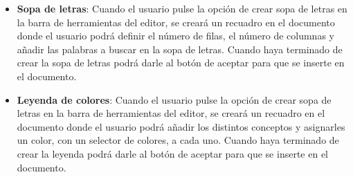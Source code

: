 \begin{itemize}
  \item \textbf{Sopa de letras}: Cuando el usuario pulse la opción de crear sopa de letras en la barra de herramientas del editor,
        se creará un recuadro en el documento donde el usuario podrá definir el número de filas, el número de columnas y añadir las palabras a buscar en la sopa de letras. Cuando haya terminado de crear la sopa de letras podrá darle al botón de aceptar para que se inserte en el documento.
  \item \textbf{Leyenda de colores}: Cuando el usuario pulse la opción de crear sopa de letras en la barra de herramientas del editor, se creará un recuadro en el documento donde el usuario podrá añadir los distintos conceptos y asignarles un color, con un selector de colores, a cada uno. Cuando haya terminado de crear la leyenda podrá darle al botón de aceptar para que se inserte en el documento.
\end{itemize}

